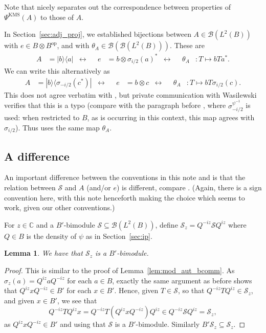 \documentclass[a4paper,11pt]{article}
\theoremstyle{plain}
\newtheorem{lemma}[proposition]{Lemma}
\theoremstyle{remark}
\newcommand{\mc}[1]{\mathcal{#1}}
\newcommand{\op}{{\operatorname{op}}}
\newcommand{\KMS}{\textrm{KMS}}
\begin{document}
Note that \cite[Proposition~3.7]{Wasilewski_Quantum_Cayley} nicely separates out the correspondence between properties of $\Psi^{\KMS}(A)$ to those of $A$.

In Section~\ref{sec:adj_proj}, we established bijections between $A\in\mc B(L^2(B))$ with $e\in B\otimes B^\op$, and with $\theta_A \in \mc B(\mc B(L^2(B)))$.  These are
\begin{align*}
A &= |b\rangle \langle a| 
&\leftrightarrow&&
e &= b \otimes \sigma_{i/2}(a)^*
&\leftrightarrow&&
\theta_A &\colon T \mapsto bTa^*.
\end{align*}
We can write this alternatively as
\begin{align*}
A &= |b\rangle \langle \sigma_{-i/2}(c^*) | 
&\leftrightarrow&&
e &= b \otimes c
&\leftrightarrow&&
\theta_A &\colon T \mapsto bT \sigma_{i/2}(c).
\end{align*}
This does not agree verbatim with \cite[Proposition~3.14]{Wasilewski_Quantum_Cayley}, but private communication with Wasilewski verifies that this is a typo (compare with the paragraph before \cite[Proposition~3.14]{Wasilewski_Quantum_Cayley}, where $\sigma_{-i/2}^{\psi^{-1}}$ is used: when restricted to $B$, as is occurring in this context, this map agrees with $\sigma_{i/2}$).  Thus \cite[Proposition~3.14]{Wasilewski_Quantum_Cayley} uses the same map $\theta_A$.


\subsection{A difference}\label{sec:diff}

An important difference between the conventions in this note and \cite{Wasilewski_Quantum_Cayley} is that the relation between $\mc S$ and $A$ (and/or $e$) is different, compare \cite[Theorem~3.15]{Wasilewski_Quantum_Cayley}.  (Again, there is a sign convention here, with this note henceforth making the choice which seems to work, given our other conventions.)

For $z\in\mathbb C$ and a $B'$-bimodule $\mc S\subseteq\mc B(L^2(B))$, define $\mc S_z = Q^{-iz} \mc S Q^{iz}$ where $Q\in B$ is the density of $\psi$ as in Section~\ref{sec:ip}.

\begin{lemma}
We have that $\mc S_z$ is a $B'$-bimodule.
\end{lemma}
\begin{proof}
This is similar to the proof of Lemma~\ref{lem:mod_aut_bcomm}.  As $\sigma_z(a) = Q^{iz} a Q^{-iz}$ for each $a\in B$, exactly the same argument as before shows that $Q^{iz} x Q^{-iz} \in B'$ for each $x\in B'$.  Hence, given $T\in\mc S$, so that $Q^{-iz} T Q^{iz} \in \mc S_z$, and given $x\in B'$, we see that
\[ Q^{-iz} T Q^{iz} x = Q^{-iz} T (Q^{iz} x Q^{-iz}) Q^{iz}
\in Q^{-iz} \mc S Q^{iz} = \mc S_z, \]
as $Q^{iz} x Q^{-iz} \in B'$ and using that $\mc S$ is a $B'$-bimodule.  Similarly $B' \mc S_z \subseteq \mc S_z$.
\end{proof}
\end{document}

